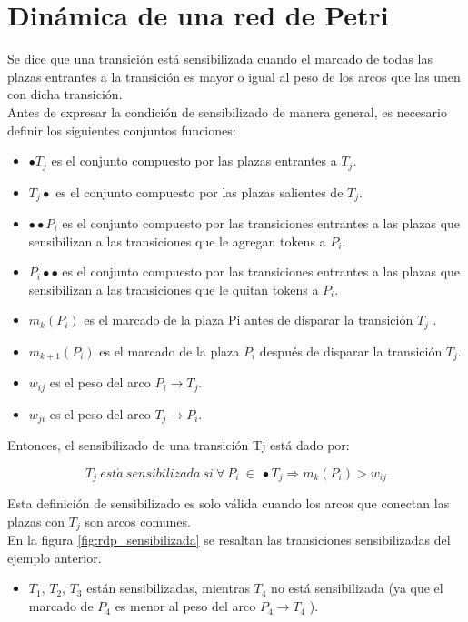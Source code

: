 \section{Dinámica de una red de Petri}
Se dice que una transición está sensibilizada cuando el marcado de todas las plazas entrantes a la transición es mayor o igual al peso de los arcos que las unen con dicha transición.\\

Antes de expresar la condición de sensibilizado de manera general, es necesario definir los siguientes conjuntos funciones:

\begin{itemize}
    \item $\bullet T_j$ es el conjunto compuesto por las plazas entrantes a $T_j$.
    \item $T_j \bullet$  es el conjunto compuesto por las plazas salientes de $T_j$.
    \item $\bullet \bullet P_i$ es el conjunto compuesto por las transiciones entrantes a las plazas que sensibilizan a las transiciones que le agregan tokens a $P_i$.
    \item $P_i \bullet \bullet$  es el conjunto compuesto por las transiciones entrantes a las plazas que sensibilizan a las transiciones que le quitan tokens a $P_i$.
    \item $m_k(P_i)$ es el marcado de la plaza Pi antes de disparar la transición $T_j$ .
    \item $m_{k+1}(P_i)$ es el marcado de la plaza $P_i$ después de disparar la transición $T_j$.
    \item $w_{ij}$ es el peso del arco $P_i \rightarrow T_j$.
    \item $w_{ji}$ es el peso del arco $T_j \rightarrow P_i$.
\end{itemize}

Entonces, el sensibilizado de una transición Tj está dado por:

\begin{equation}
    T_j \ est\acute{a} \ sensibilizada \ si \ \forall \ P_i \ \in \ \bullet T_j \Rightarrow m_k (P_i) > w_{ij}
\end{equation}

Esta definición de sensibilizado es solo válida cuando los arcos que conectan las plazas con $T_j$ son arcos comunes. \\
En la figura \ref{fig:rdp_sensibilizada} se resaltan las transiciones sensibilizadas del ejemplo anterior.

\begin{itemize}
    \item $T_1$, $T_2$, $T_3$ están sensibilizadas, mientras $T_4$ no está sensibilizada (ya que el marcado de $P_4$ es menor al peso del arco $P_4 \rightarrow T_4$ ).
\end{itemize}

